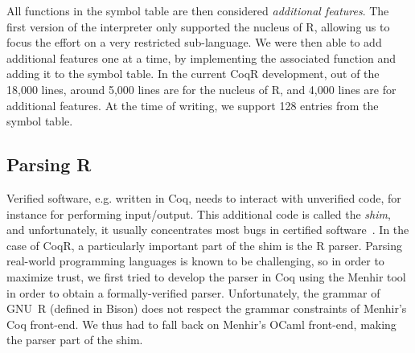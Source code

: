 \documentclass[
    sigplan,
    10pt,
    review, %
    natbib=false %
 ]{acmart}
\newcommand\mb[1]{\todo[color=purple!20,size=\scriptsize]{#1}}
\newcommand\et[1]{\todo[color=blue!20,size=\scriptsize]{#1}}
\newcommand\eti[1]{\todo[color=blue!20,inline]{#1}}
\newcommand\CoqR{CoqR}
\begin{document}
All functions in the symbol table are then considered {\em additional features}. The first version of the interpreter only supported the nucleus of R, allowing us to focus the effort on a very restricted sub-language.
We were then able to add additional features one at a time, by implementing
the associated function and adding it to the symbol table.
In the current \CoqR{} development, out of the 18,000 lines,
around 5,000 lines are for the nucleus of R,
and 4,000 lines are for additional features.
At the time of writing, we support 128 entries from the symbol table.


\subsection{Parsing R}
\label{sec:parsing}

Verified software, e.g. written in Coq, needs to interact with unverified code, for instance for performing input/output. This additional code is called the \emph{shim}, and unfortunately, it usually concentrates most bugs in certified software~\parencite{Yang:2011:FUB:1993498.1993532}.
In the case of \CoqR{}, a particularly important part of the shim is the R parser. Parsing real-world programming languages is known to be challenging, so in order to maximize trust, we first tried to develop the parser in Coq
using the Menhir tool~\parencite{jourdan2012validating} in order to obtain a formally-verified parser. Unfortunately, the grammar of GNU~R (defined in Bison) does not respect the grammar constraints of Menhir's Coq front-end. We thus had to fall back on Menhir's OCaml front-end, making the parser part of the shim.
\end{document}
